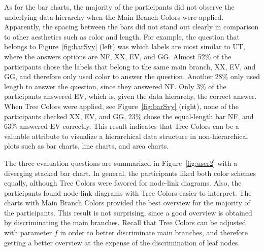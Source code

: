 \documentclass[journal]{vgtc}                %
\begin{document}

As for the bar charts, the majority of the participants did not observe the underlying data hierarchy when the Main Branch Colors were applied. Apparently, the spacing between the bars did not stand out clearly in comparison to other aesthetics such as color and length. For example, the question that belongs to Figure~\ref{fig:barSvy} (left) was which labels are most similar to UT, where the answers options are NF, XX, EV, and GG. Almost 52\% of the participants chose the labels that belong to the same main branch, XX, EV, and GG, and therefore only used color to answer the question. Another 28\% only used length to answer the question, since they answered NF. Only 3\% of the participants answered EV, which is, given the data hierarchy, the correct answer. When Tree Colors were applied, see Figure~\ref{fig:barSvy} (right), none of the participants checked XX, EV, and GG, 23\% chose the equal-length bar NF, and 63\% answered EV correctly. This result indicates that Tree Colors can be a valuable attribute to visualize a hierarchical data structure in non-hierarchical plots such as bar charts, line charts, and area charts.



The three evaluation questions are summarized in Figure~\ref{fig:user2} with a diverging stacked bar chart. In general, the participants liked both color schemes equally, although Tree Colors were favored for node-link diagrams. Also, the participants found node-link diagrams with Tree Colors easier to interpret. The charts with Main Branch Colors provided the best overview for the majority of the participants. This result is not surprising, since a good overview is obtained by discriminating the main branches. Recall that Tree Colors can be adjusted with parameter $f$ in order to better discriminate main branches, and therefore getting a better overview at the expense of the discrimination of leaf nodes.
\end{document}

